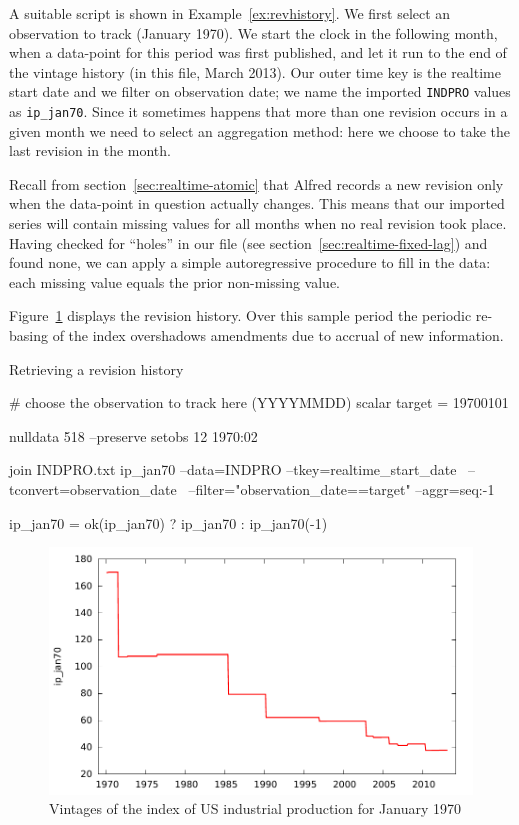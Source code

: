 A suitable script is shown in Example~\ref{ex:revhistory}.  We first
select an observation to track (January 1970). We start the clock in
the following month, when a data-point for this period was first
published, and let it run to the end of the vintage history (in this
file, March 2013).  Our outer time key is the realtime start date and
we filter on observation date; we name the imported \texttt{INDPRO}
values as \texttt{ip\_jan70}. Since it sometimes happens that more
than one revision occurs in a given month we need to select an
aggregation method: here we choose to take the last revision in the
month.

Recall from section~\ref{sec:realtime-atomic} that Alfred records a
new revision only when the data-point in question actually
changes. This means that our imported series will contain missing
values for all months when no real revision took place. Having checked
for ``holes'' in our file (see section~\ref{sec:realtime-fixed-lag})
and found none, we can apply a simple autoregressive procedure to fill
in the data: each missing value equals the prior non-missing value.

Figure~\ref{fig:realtime-revhist} displays the revision history. Over
this sample period the periodic re-basing of the index overshadows
amendments due to accrual of new information.

\begin{script}[htbp]
  \caption{Retrieving a revision history}
  \label{ex:revhistory}
\begin{scode}
# choose the observation to track here (YYYYMMDD)
scalar target = 19700101

nulldata 518 --preserve
setobs 12 1970:02

join INDPRO.txt ip_jan70 --data=INDPRO --tkey=realtime_start_date \
--tconvert=observation_date \
--filter="observation_date==target" --aggr=seq:-1

ip_jan70 = ok(ip_jan70) ? ip_jan70 : ip_jan70(-1)
\end{scode}
\end{script}

\begin{figure}[htbp]
  \centering
\includegraphics[scale=0.75]{figures/revhist}
\caption{Vintages of the index of US industrial production for January
  1970}
  \label{fig:realtime-revhist}
\end{figure}

    

